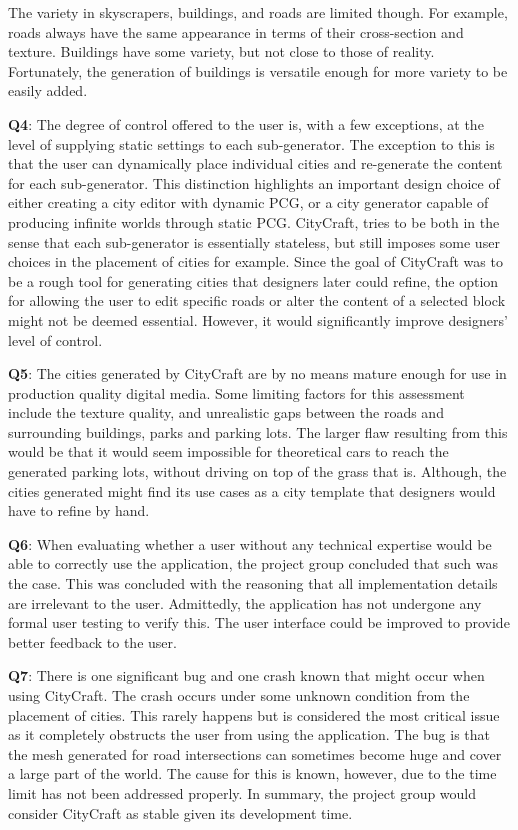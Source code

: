 The variety in skyscrapers, buildings, and roads are limited though.
For example, roads always have the same appearance in terms of their cross-section and texture.
Buildings have some variety, but not close to those of reality.
Fortunately, the generation of buildings is versatile enough for more variety to be easily added.

\textbf{Q4}:
The degree of control offered to the user is, with a few exceptions, at the level of supplying static settings to each sub-generator.
The exception to this is that the user can dynamically place individual cities and re-generate the content for each sub-generator.
This distinction highlights an important design choice of either creating a city editor with dynamic PCG, or a city generator capable of producing infinite worlds through static PCG.
CityCraft, tries to be both in the sense that each sub-generator is essentially stateless, but still imposes some user choices in the placement of cities for example.
Since the goal of CityCraft was to be a rough tool for generating cities that designers later could refine, the option for allowing the user to edit specific roads or alter the content of a selected block might not be deemed essential.
However, it would significantly improve designers' level of control.

\textbf{Q5}:
The cities generated by CityCraft are by no means mature enough for use in production quality digital media.
Some limiting factors for this assessment include the texture quality, and unrealistic gaps between the roads and surrounding buildings, parks and parking lots.
The larger flaw resulting from this would be that it would seem impossible for theoretical cars to reach the generated parking lots, without driving on top of the grass that is.
Although, the cities generated might find its use cases as a city template that designers would have to refine by hand.

\textbf{Q6}:
When evaluating whether a user without any technical expertise would be able to correctly use the application, the project group concluded that such was the case.
This was concluded with the reasoning that all implementation details are irrelevant to the user.
Admittedly, the application has not undergone any formal user testing to verify this.
The user interface could be improved to provide better feedback to the user.

\textbf{Q7}:
There is one significant bug and one crash known that might occur when using CityCraft.
The crash occurs under some unknown condition from the placement of cities.
This rarely happens but is considered the most critical issue as it completely obstructs the user from using the application.
The bug is that the mesh generated for road intersections can sometimes become huge and cover a large part of the world.
The cause for this is known, however, due to the time limit has not been addressed properly.
In summary, the project group would consider CityCraft as stable given its development time.
